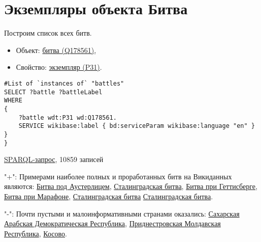 \section{Экземпляры объекта Битва}

Построим список всех битв.

\begin{itemize}
    \item Объект: \href{https://www.wikidata.org/wiki/Q178561}{битва (Q178561)},
    \item Свойство: \href{https://www.wikidata.org/wiki/Property:P31}{экземпляр (P31)}.
\end{itemize}

\begin{lstlisting}[language=SPARQL]
#List of `instances of` "battles" 
SELECT ?battle ?battleLabel
WHERE
{
    ?battle wdt:P31 wd:Q178561.
    SERVICE wikibase:label { bd:serviceParam wikibase:language "en" }
}
}

\end{lstlisting}

\href{https://query.wikidata.org/#%23added%202017-02%0A%23List%20of%20%60instances%20of%60%20%22national%20park%22%20%0ASELECT%20%3Fbattle%20%3FbattleLabel%0AWHERE%0A%7B%0A%20%20%20%20%3Fbattle%20wdt%3AP31%20wd%3AQ178561.%0A%20%20%20%20SERVICE%20wikibase%3Alabel%20%7B%20bd%3AserviceParam%20wikibase%3Alanguage%20%22en%22%20%7D%0A%7D}{SPARQL-запрос}, 10859 записей

"+": Примерами наиболее полных и проработанных битв на Викиданных являются:
\href{https://www.wikidata.org/wiki/Q134114}{Битва под Аустерлицем}, 
\href{https://www.wikidata.org/wiki/Q38789}{Сталинградская битва},
\href{https://www.wikidata.org/wiki/Q33132}{Битва при Геттисберге},
\href{https://www.wikidata.org/wiki/Q31900|]], [[d:Q48314|Битва при Ватерлоо]], [[d:Q210354|Куликовская битва}{Битва при Марафоне},
\href{https://www.wikidata.org/wiki/Q38789}{Сталинградская битва}
\href{https://www.wikidata.org/wiki/Q38789}{Сталинградская битва}.

"-": Почти пустыми и малоинформативными странами оказались:
\href{https://www.wikidata.org/wiki/Q40362}{Сахарская Арабская Демократическая Республика},
\href{https://www.wikidata.org/wiki/Q907112}{Приднестровская Молдавская Республика},
\href{https://www.wikidata.org/wiki/Q1246}{Косово}.